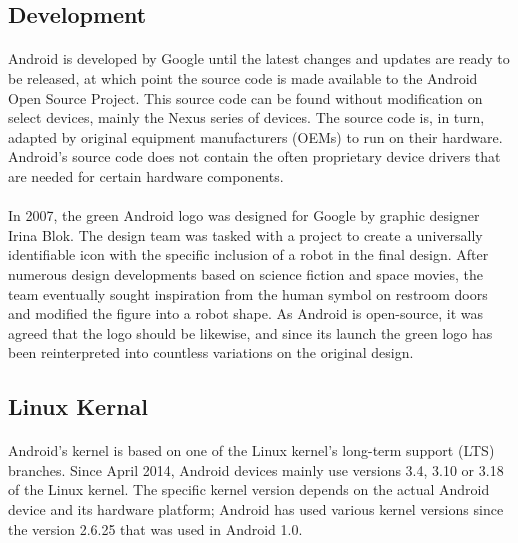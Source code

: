 \documentclass[a4paper,12pt]{report}
\begin{document}
\subsection{Development}
\paragraph{}Android is developed by Google until the latest changes and updates are ready to be released, at which point the source code is made available to the Android Open Source Project. This source code can be found without modification on select devices, mainly the Nexus series of devices. The source code is, in turn, adapted by original equipment manufacturers (OEMs) to run on their hardware. Android's source code does not contain the often proprietary device drivers that are needed for certain hardware components. 
\paragraph{}In 2007, the green Android logo was designed for Google by graphic designer Irina Blok. The design team was tasked with a project to create a universally identifiable icon with the specific inclusion of a robot in the final design. After numerous design developments based on science fiction and space movies, the team eventually sought inspiration from the human symbol on restroom doors and modified the figure into a robot shape. As Android is open-source, it was agreed that the logo should be likewise, and since its launch the green logo has been reinterpreted into countless variations on the original design.
\subsection{Linux Kernal}
\paragraph{}Android's kernel is based on one of the Linux kernel's long-term support (LTS) branches. Since April 2014, Android devices mainly use versions 3.4, 3.10 or 3.18 of the Linux kernel. The specific kernel version depends on the actual Android device and its hardware platform; Android has used various kernel versions since the version 2.6.25 that was used in Android 1.0.
\end{document}
